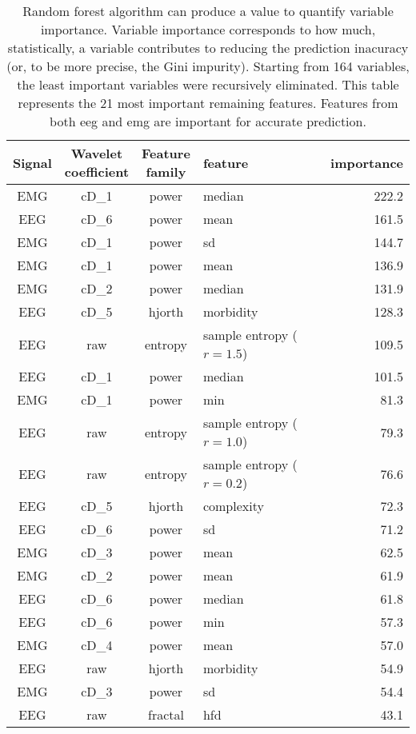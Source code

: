 \begin {table}[!h]
\begin{center}
\caption{
Random forest algorithm can produce a value to quantify variable importance.
Variable importance corresponds to how much, statistically, a variable contributes to reducing the prediction inacuracy (or, to be more precise, the Gini impurity).
Starting from 164 variables, the least important variables were recursively eliminated.
This table represents the 21 most important remaining features.
Features from both \gls{eeg} and \gls{emg} are important for accurate prediction.
\label{tab:importances}}

\small
\begin{tabular}{|c|c|c|l|r|}
  \hline
 Signal & \specialcell{Wavelet\\coefficient} & \specialcell{Feature\\family}  & feature & importance\\
\hline
\hline
EMG & cD\_1 & power & median & 222.2\\
EEG & cD\_6 & power & mean & 161.5\\
EMG & cD\_1 & power & sd &  144.7\\
EMG & cD\_1 & power & mean & 136.9\\
EMG & cD\_2 & power & median & 131.9\\
EEG & cD\_5 & hjorth & morbidity & 128.3\\
EEG & raw & entropy & sample entropy ($r=1.5$) & 109.5\\
EEG & cD\_1 & power & median & 101.5\\
EMG & cD\_1 & power & min & 81.3\\
EEG & raw & entropy & sample entropy ($r=1.0$) & 79.3\\
EEG & raw & entropy & sample entropy ($r=0.2$) & 76.6\\
EEG & cD\_5 & hjorth & complexity & 72.3\\
EEG & cD\_6 & power & sd & 71.2\\
EMG & cD\_3 & power & mean & 62.5\\
EMG & cD\_2 & power & mean & 61.9\\
EEG & cD\_6 & power & median & 61.8\\
EEG & cD\_6 & power & min & 57.3\\
EMG & cD\_4 & power & mean & 57.0\\
EEG & raw & hjorth & morbidity & 54.9\\
EMG & cD\_3 & power & sd & 54.4\\
EEG & raw & fractal & hfd & 43.1\\
\hline
 


\end{tabular}
\end{center}
\end{table}

